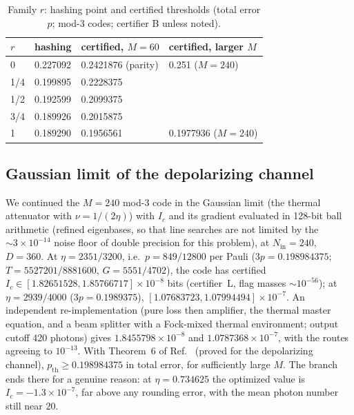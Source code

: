 \documentclass[aps,pra,reprint,superscriptaddress,nofootinbib,longbibliography,floatfix]{revtex4-2}
\theoremstyle{remark}
\newcommand{\Ic}{I_c}
\begin{document}
\begin{table}[t]
\caption{Family $r$: hashing point and certified thresholds (total error $p$; mod-3 codes; certifier B
unless noted).}
\label{tab:family}
\begin{ruledtabular}
\begin{tabular}{llll}
$r$ & hashing & certified, $M=60$ & certified, larger $M$\\
\hline
0 & 0.227092 & 0.2421876 (parity) & 0.251 ($M=240$)\\
1/4 & 0.199895 & 0.2228375 & \\
1/2 & 0.192599 & 0.2099375 & \\
3/4 & 0.189926 & 0.2015875 & \\
1 & 0.189290 & 0.1956561 & 0.1977936 ($M=240$)\\
\end{tabular}
\end{ruledtabular}
\end{table}

\subsection{Gaussian limit of the depolarizing channel}
\label{sec:depgauss}
We continued the $M=240$ mod-3 code in the Gaussian limit (the thermal attenuator with $\nu=1/(2\eta)$)
with $\Ic$ and its gradient evaluated in 128-bit ball arithmetic (refined eigenbases, so that line searches
are not limited by the $\sim3\times10^{-14}$ noise floor of double precision for this problem), at
$N_{\mathrm{in}}=240$, $D=360$. At $\eta=2351/3200$, i.e.\ $p=849/12800$ per Pauli
($3p=0.198984375$; $T=5527201/8881600$, $G=5551/4702$), the code has certified
$\Ic\in[1.82651528,1.85766717]\times10^{-8}$ bits (certifier~L, flag masses $\sim10^{-56}$); at
$\eta=2939/4000$ ($3p=0.1989375$), $[1.07683723,1.07994494]\times10^{-7}$. An independent
re-implementation (pure loss then amplifier, the thermal master equation, and a beam splitter with a
Fock-mixed thermal environment; output cutoff 420 photons) gives $1.8455798\times10^{-8}$ and
$1.0787368\times10^{-7}$, with the routes agreeing to $10^{-13}$. With Theorem~6 of
Ref.~\cite{ahmed2026choir} (proved for the depolarizing channel), $p_{\mathrm{th}}\ge0.198984375$ in total
error, for sufficiently large $M$. The branch ends there for a genuine reason: at $\eta=0.734625$ the
optimized value is $\Ic=-1.3\times10^{-7}$, far above any rounding error, with the mean photon number
still near $20$.
\end{document}
